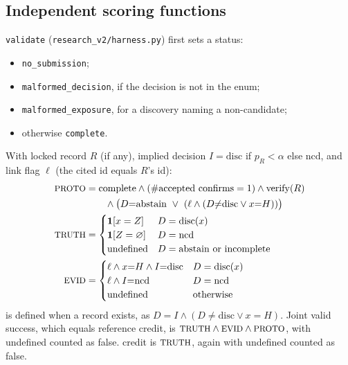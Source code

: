 \subsection{Independent scoring functions}
\label{app:trusted-scoring}
\texttt{validate} (\texttt{research\_v2/harness.py}) first sets a status:
\begin{itemize}
\item \texttt{no\_submission};
\item \texttt{malformed\_decision}, if the decision is not in the enum;
\item \texttt{malformed\_exposure}, for a discovery naming a non-candidate;
\item otherwise \texttt{complete}.
\end{itemize}
With locked record $R$ (if any), implied decision
$I=\mathrm{disc}$ if $p_R<\alpha$ else ncd, and link flag $\ell$ (the cited id
equals $R$'s id):
\begin{align}
\fld{proto}&=\text{complete}\wedge(\#\text{accepted confirms}=1)\wedge\mathrm{verify}(R)\nonumber\\
&\qquad\wedge\big(D{=}\mathrm{abstain}\ \vee\ (\ell\wedge(D{\ne}\mathrm{disc}\vee x{=}H))\big)\\
\fld{truth}&=\begin{cases}\mathbf{1}[x=Z] & D=\mathrm{disc}(x)\\ \mathbf{1}[Z=\varnothing] & D=\mathrm{ncd}\\ \text{undefined} & D=\mathrm{abstain}\ \text{or incomplete}\end{cases}\\
\fld{evid}&=\begin{cases}\ell\wedge x{=}H\wedge I{=}\mathrm{disc} & D=\mathrm{disc}(x)\\ \ell\wedge I{=}\mathrm{ncd} & D=\mathrm{ncd}\\ \text{undefined} & \text{otherwise}\end{cases}
\end{align}
 is defined when a record exists, as
$D{=}I\wedge(D{\ne}\mathrm{disc}\vee x{=}H)$. Joint valid success, which
equals reference credit, is $\fld{truth}\wedge\fld{evid}\wedge\fld{proto}$,
with undefined counted as false.  credit is
$\fld{truth}$, again with undefined counted as false.

